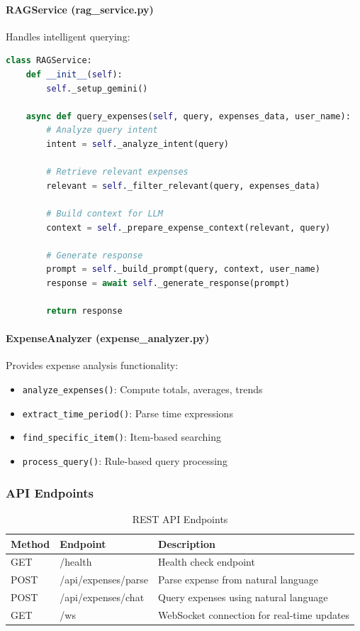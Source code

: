 \paragraph{RAGService (rag\_service.py)}

Handles intelligent querying:

\begin{lstlisting}[language=Python, caption=RAGService Implementation]
class RAGService:
    def __init__(self):
        self._setup_gemini()
        
    async def query_expenses(self, query, expenses_data, user_name):
        # Analyze query intent
        intent = self._analyze_intent(query)
        
        # Retrieve relevant expenses
        relevant = self._filter_relevant(query, expenses_data)
        
        # Build context for LLM
        context = self._prepare_expense_context(relevant, query)
        
        # Generate response
        prompt = self._build_prompt(query, context, user_name)
        response = await self._generate_response(prompt)
        
        return response
\end{lstlisting}

\paragraph{ExpenseAnalyzer (expense\_analyzer.py)}

Provides expense analysis functionality:

\begin{itemize}
    \item \texttt{analyze\_expenses()}: Compute totals, averages, trends
    \item \texttt{extract\_time\_period()}: Parse time expressions
    \item \texttt{find\_specific\_item()}: Item-based searching
    \item \texttt{process\_query()}: Rule-based query processing
\end{itemize}

\subsubsection{API Endpoints}

\begin{table}[H]
\centering
\caption{REST API Endpoints}
\label{tab:api-endpoints}
\begin{tabular}{|p{2cm}|p{4cm}|p{7cm}|}
\hline
\textbf{Method} & \textbf{Endpoint} & \textbf{Description} \\
\hline
GET & /health & Health check endpoint \\
\hline
POST & /api/expenses/parse & Parse expense from natural language \\
\hline
POST & /api/expenses/chat & Query expenses using natural language \\
\hline
GET & /ws & WebSocket connection for real-time updates \\
\hline
\end{tabular}
\end{table}

